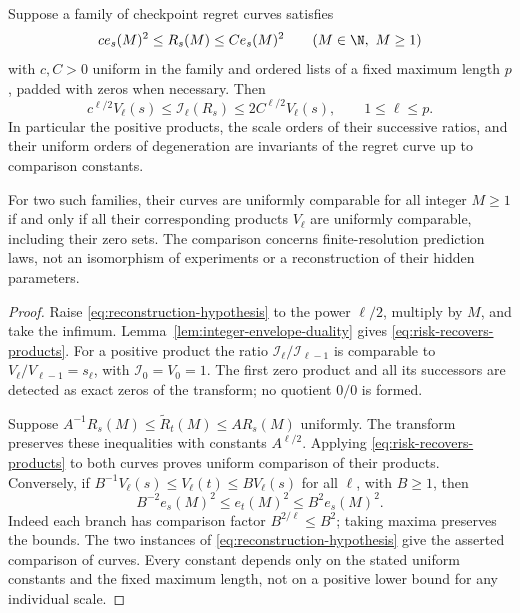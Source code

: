 \begin{theorem}
\label{thm:operational-reconstruction}
Suppose a family of checkpoint regret curves satisfies
\begin{equation}\label{eq:reconstruction-hypothesis}
 c e_s(M)^2\le R_s(M)\le C e_s(M)^2
 \qquad(M\in\N,\ M\ge1)
\end{equation}
with $c,C>0$ uniform in the family and ordered lists of a fixed
maximum length $p$, padded with zeros when necessary. Then
\begin{equation}\label{eq:risk-recovers-products}
 c^{\ell/2}V_\ell(s)\le\mathcal I_\ell(R_s)
             \le2C^{\ell/2}V_\ell(s),\qquad 1\le\ell\le p.
\end{equation}
In particular the positive products, the scale orders of their successive
ratios, and their uniform orders of degeneration are
invariants of the regret curve up to comparison constants.

For two such families, their curves are uniformly comparable for all
integer $M\ge1$ if and only if all their corresponding products
$V_\ell$ are uniformly comparable, including their zero sets.
The comparison concerns finite-resolution prediction laws, not an
isomorphism of experiments or a reconstruction of their hidden parameters.
\end{theorem}
\begin{proof}
Raise \eqref{eq:reconstruction-hypothesis} to the power $\ell/2$,
multiply by $M$, and take the infimum. Lemma~\ref{lem:integer-envelope-duality}
gives \eqref{eq:risk-recovers-products}. For a positive product the
ratio $\mathcal I_\ell/\mathcal I_{\ell-1}$ is comparable to
$V_\ell/V_{\ell-1}=s_\ell$, with $\mathcal I_0=V_0=1$.
The first zero product and all its successors are detected as exact
zeros of the transform; no quotient $0/0$ is formed.

Suppose $A^{-1}R_s(M)\le\widetilde R_t(M)\le A R_s(M)$ uniformly.
The transform preserves these inequalities with constants $A^{\ell/2}$.
Applying \eqref{eq:risk-recovers-products} to both curves proves uniform
comparison of their products. Conversely, if
$B^{-1}V_\ell(s)\le V_\ell(t)\le B V_\ell(s)$ for all $\ell$,
with $B\ge1$, then
\[
 B^{-2}e_s(M)^2\le e_t(M)^2\le B^2e_s(M)^2.
\]
Indeed each branch has comparison factor $B^{2/\ell}\le B^2$;
taking maxima preserves the bounds. The two instances of
\eqref{eq:reconstruction-hypothesis} give the asserted comparison of
curves. Every constant depends only on the stated uniform constants
and the fixed maximum length, not on a positive lower bound for any
individual scale.
\end{proof}

